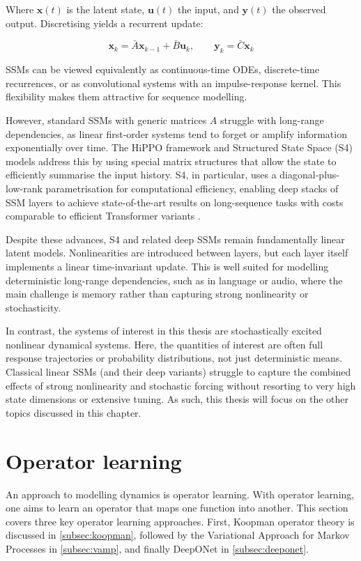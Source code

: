 Where $\mathbf{x}(t)$ is the latent state, $\mathbf{u}(t)$ the input, and $\mathbf{y}(t)$ the observed output.
Discretising yields a recurrent update:

\begin{equation}
    \label{eq:ssm_discrete}
    \mathbf{x}_k = \bar{A}\mathbf{x}_{k-1} + \bar{B}\mathbf{u}_k, \qquad \mathbf{y}_k = \bar{C}\mathbf{x}_k
\end{equation}

SSMs can be viewed equivalently as continuous-time ODEs, discrete-time recurrences, or as convolutional systems with an impulse-response kernel. This flexibility makes them attractive for sequence modelling.

However, standard SSMs with generic matrices $A$ struggle with long-range dependencies, as linear first-order systems
tend to forget or amplify information exponentially over time. The HiPPO framework and Structured State Space (S4)
models address this by using special matrix structures that allow the state to efficiently summarise the input history.
S4, in particular, uses a diagonal-plus-low-rank parametrisation for computational efficiency, enabling deep stacks of
SSM layers to achieve state-of-the-art results on long-sequence tasks with costs comparable to efficient Transformer
variants \parencites{guEfficientlyModelingLong2022}{guMambaLinearTimeSequence2024}.

Despite these advances, S4 and related deep SSMs remain fundamentally linear latent models. Nonlinearities are introduced between layers, but each layer itself implements a linear time-invariant update. This is well suited for modelling deterministic long-range dependencies, such as in language or audio, where the main challenge is memory rather than capturing strong nonlinearity or stochasticity.

In contrast, the systems of interest in this thesis are stochastically excited nonlinear dynamical systems. Here, the
quantities of interest are often full response trajectories or probability distributions, not just deterministic means.
Classical linear SSMs (and their deep variants) struggle to capture the combined effects of strong nonlinearity and
stochastic forcing without resorting to very high state dimensions or extensive tuning. As such, this thesis will focus
on the other topics discussed in this chapter.

\section{Operator learning}
\label{sec:operator_learning}
An approach to modelling dynamics is operator learning. With operator learning, one aims to learn an operator that maps
one function into another. This section covers three key operator learning approaches. First, Koopman operator theory is discussed in \cref{subsec:koopman}, followed by the Variational Approach for Markov Processes in \cref{subsec:vamp}, and finally DeepONet in \cref{subsec:deeponet}. 

